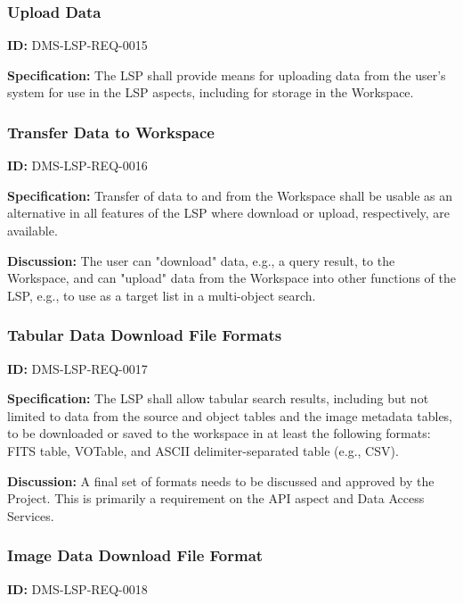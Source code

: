 \documentclass[SE,toc,lsstdraft]{lsstdoc}
\begin{document}
\subsubsection{Upload Data}

\label{DMS-LSP-REQ-0015}
\textbf{ID:} DMS-LSP-REQ-0015

\textbf{Specification:}
The LSP shall provide means for uploading data from the user's system for use in the LSP aspects, including for storage in the Workspace.

\subsubsection{Transfer Data to Workspace}

\label{DMS-LSP-REQ-0016}
\textbf{ID:} DMS-LSP-REQ-0016

\textbf{Specification:}
Transfer of data to and from the Workspace shall be usable as an alternative in all features of the LSP where download or upload, respectively, are available.

\textbf{Discussion:}
The user can "download" data, e.g., a query result, to the Workspace, and can "upload" data from the Workspace into other functions of the LSP, e.g., to use as a target list in a multi-object search.

\subsubsection{Tabular Data Download File Formats}

\label{DMS-LSP-REQ-0017}
\textbf{ID:} DMS-LSP-REQ-0017

\textbf{Specification:}
The LSP shall allow tabular search results, including but not limited to data from the source and object tables and the image metadata tables, to be downloaded or saved to the workspace in at least the following formats: FITS table, VOTable, and ASCII delimiter-separated table (e.g., CSV).

\textbf{Discussion:}
A final set of formats needs to be discussed and approved by the Project.
This is primarily a requirement on the API aspect and Data Access Services.

\subsubsection{Image Data Download File Format}

\label{DMS-LSP-REQ-0018}
\textbf{ID:} DMS-LSP-REQ-0018
\end{document}
